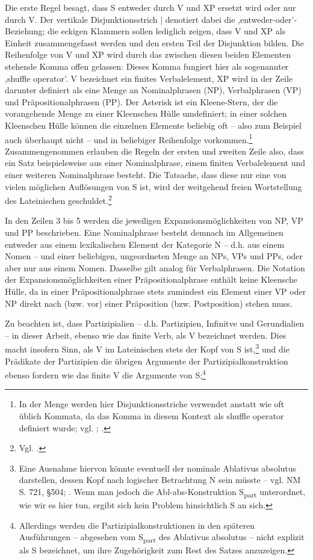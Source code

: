 \documentclass[12pt,a4paper]{article}
\begin{document}
Die erste Regel besagt, dass S entweder durch V und XP ersetzt wird oder nur durch V. Der vertikale Disjunktionsstrich $\mid$ denotiert dabei die ,entweder-oder'-Beziehung; die eckigen Klammern sollen lediglich zeigen, dass V und XP als Einheit zusammengefasst werden und den ersten Teil der Disjunktion bilden. Die Reihenfolge von V und XP wird durch das zwischen diesen beiden Elementen stehende Komma offen gelassen: Dieses Komma fungiert hier als sogenannter ,shuffle operator'. V bezeichnet ein finites Verbalelement, XP wird in der Zeile darunter definiert als eine Menge an Nominalphrasen (NP), Verbalphrasen (VP) und Präpositionalphrasen (PP). Der Asterisk ist ein Kleene-Stern, der die vorangehende Menge zu einer Kleenschen Hülle umdefiniert; in einer solchen Kleenschen Hülle können die einzelnen Elemente beliebig oft -- also zum Beispiel auch überhaupt nicht -- und in beliebiger Reihenfolge vorkommen.\footnote{In der Menge werden hier Disjunktionsstriche verwendet anstatt wie oft üblich Kommata, da das Komma in diesem Kontext als shuffle operator definiert wurde; vgl. \cite[26]{Skript}; \cite{Snijders}.} Zusammengenommen erlauben die Regeln der ersten und zweiten Zeile also, dass ein Satz beispielsweise aus einer Nominalphrase, einem finiten Verbalelement und einer weiteren Nominalphrase besteht. Die Tatsache, dass diese nur eine von vielen möglichen Auflösungen von S ist, wird der weitgehend freien Wortstellung des Lateinischen geschuldet.\footnote{Vgl. \cite[19]{Rohrer}.}

In den Zeilen 3 bis 5 werden die jeweiligen Expansionsmöglichkeiten von NP, VP und PP beschrieben. Eine Nominalphrase besteht demnach im Allgemeinen entweder aus einem lexikalischen Element der Kategorie N – d.h. aus einem Nomen -- und einer beliebigen, ungeordneten Menge an NPs, VPs und PPs, oder aber nur aus einem Nomen. Dasselbe gilt analog für Verbalphrasen. Die Notation der Expansionsmöglichkeiten einer Präpositionalphrase enthält keine Kleensche Hülle, da in einer Präpositionalphrase stets zumindest ein Element einer VP oder NP direkt nach (bzw. vor) einer Präposition (bzw. Postposition) stehen muss.

Zu beachten ist, dass Partizipialien – d.h. Partizipien, Infinitve und Gerundialien -- in dieser Arbeit, ebenso wie das finite Verb, als V bezeichnet werden. Dies macht insofern Sinn, als V im Lateinischen stets der Kopf von S ist,\footnote{Eine Ausnahme hiervon könnte eventuell der nominale Ablativus absolutus darstellen, dessen Kopf nach logischer Betrachtung N sein müsste -- vgl. NM S. 721, §504; \cite[64]{Falk}. Wenn man jedoch die Abl-abs-Konstruktion S\textsubscript{part} unterordnet, wie wir es hier tun, ergibt sich kein Problem hinsichtlich S an sich.} und die Prädikate der Partizipien die übrigen Argumente der Partizipialkonstruktion ebenso fordern wie das finite V die Argumente von S;\footnote{Allerdings werden die Partizipialkonstruktionen in den späteren Ausführungen -- abgesehen vom S\textsubscript{part} des Ablativus absolutus -- nicht explizit als S bezeichnet, um ihre Zugehörigkeit zum Rest des Satzes anzuzeigen.}
\end{document}
